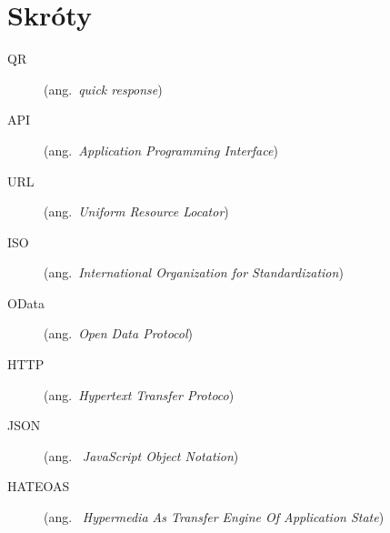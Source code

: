 \chapter*{Skróty}\mbox{}
\label{sec:skroty}
\noindent
\begin{description}
  \item [QR] (ang.\ \emph{quick response})
  \item [API] (ang.\ \emph{Application Programming Interface})
  \item [URL] (ang.\ \emph{Uniform Resource Locator})
  \item [ISO] (ang.\ \emph{International Organization for Standardization})
  \item [OData] (ang.\ \emph{Open Data Protocol})
  \item [HTTP] (ang.\ \emph{Hypertext Transfer Protoco})
  \item [JSON] (ang. \ \emph{JavaScript Object Notation})
  \item [HATEOAS] (ang. \ \emph{Hypermedia As Transfer Engine Of Application State})
\end{description}
